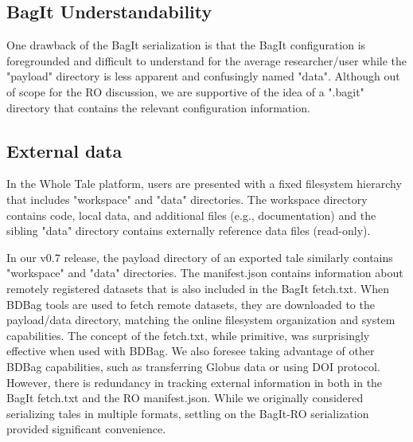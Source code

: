 \documentclass[conference]{IEEEtran}
\begin{document}
\subsection{BagIt Understandability}

One drawback of the BagIt serialization is that the BagIt configuration is foregrounded and 
difficult to understand for the average researcher/user while the "payload" directory is less 
apparent and confusingly named "data". Although out of scope for the RO discussion, we are 
supportive of the idea of a ".bagit" directory that contains the relevant configuration 
information.

\subsection{External data}
In the Whole Tale platform, users are presented with a fixed filesystem hierarchy that includes  
"workspace" and "data" directories. The workspace directory contains code, local data, and 
additional files (e.g., documentation) and the sibling "data" directory contains externally 
reference data files (read-only).

In our v0.7 release, the payload directory of an exported tale similarly contains "workspace" and 
"data" directories. The manifest.json contains information about remotely registered datasets that 
is also included in the BagIt fetch.txt.  When BDBag tools are used to fetch remote datasets, they 
are downloaded to the payload/data directory, matching the online filesystem organization and 
system capabilities.  The concept of the fetch.txt, while primitive, was surprisingly effective 
when used with BDBag. We also foresee taking advantage of other BDBag capabilities, such as 
transferring Globus data or using DOI protocol. However, there is redundancy in tracking external 
information in both in the BagIt fetch.txt and the RO manifest.json. While we originally 
considered serializing tales in multiple formats, settling on the BagIt-RO serialization provided 
significant convenience.
\end{document}
